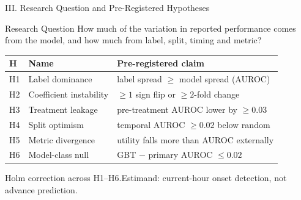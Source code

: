 \begin{frame}{III. Research Question and Pre-Registered Hypotheses}
\begin{block}{Research Question}
  \small How much of the variation in reported performance comes from the
  model, and how much from label, split, timing and metric?
\end{block}

\vspace{2pt}
\begin{center}\renewcommand{\arraystretch}{1.12}\small
\begin{tabular}{lll}
\toprule
\textbf{H} & \textbf{Name} & \textbf{Pre-registered claim} \\
\midrule
H1 & Label dominance         & label spread $\geq$ model spread (AUROC) \\
H2 & Coefficient instability & $\geq 1$ sign flip or $\geq 2$-fold change \\
H3 & Treatment leakage       & pre-treatment AUROC lower by $\geq 0.03$ \\
H4 & Split optimism          & temporal AUROC $\geq 0.02$ below random \\
H5 & Metric divergence       & utility falls more than AUROC externally \\
H6 & Model-class null        & GBT $-$ primary AUROC $\leq 0.02$ \\
\bottomrule
\end{tabular}
\end{center}

{\scriptsize Holm correction across H1--H6.\quad Estimand: current-hour onset
detection, not advance prediction.\par}

\end{frame}
